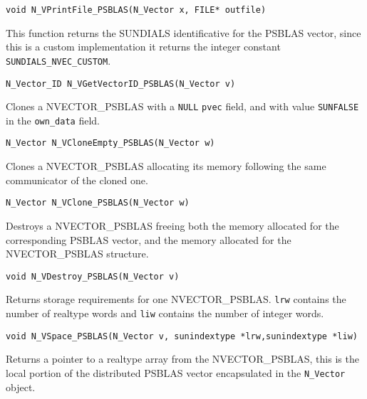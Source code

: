 \documentclass[twoside,a4paper]{refart}
\begin{document}
\begin{description}
	 \lstinline[style=CStyle]|void N_VPrintFile_PSBLAS(N_Vector x, FILE* outfile)|
	
	\item[\fbox{\texttt{N\_VGetVectorID\_PSBLAS}}] This function returns the SUNDIALS identificative for the PSBLAS vector, since this is a custom implementation it returns the integer constant \lstinline[style=CStyle]|SUNDIALS_NVEC_CUSTOM|.
	
	 \lstinline[style=CStyle]|N_Vector_ID N_VGetVectorID_PSBLAS(N_Vector v)|
 	
 	\item[\fbox{\texttt{N\_VCloneEmpty\_PSBLAS}}] Clones a NVECTOR\_PSBLAS with a \lstinline[style=CStyle]|NULL| \lstinline[style=CStyle]|pvec| field, and with value \lstinline[style=CStyle]|SUNFALSE| in the \lstinline[style=CStyle]|own_data| field.
 	
 	 \lstinline[style=CStyle]|N_Vector N_VCloneEmpty_PSBLAS(N_Vector w)|
 	
 	\item[\fbox{\texttt{N\_VClone\_PSBLAS}}] Clones a NVECTOR\_PSBLAS allocating its memory following the same communicator of the cloned one.
 	
 	 \lstinline[style=CStyle]|N_Vector N_VClone_PSBLAS(N_Vector w)|
 	
 	\item[\fbox{\texttt{N\_VDestroy\_PSBLAS}}] Destroys a NVECTOR\_PSBLAS freeing both the memory allocated for the corresponding PSBLAS vector, and the memory allocated for the NVECTOR\_PSBLAS structure.
 	
 	 \lstinline[style=CStyle]|void N_VDestroy_PSBLAS(N_Vector v)|
 	
 	\item[\fbox{\texttt{N\_VSpace\_PSBLAS}}] Returns storage requirements for one NVECTOR\_PSBLAS. \lstinline[style=CStyle]|lrw| contains the number of realtype words and \lstinline[style=CStyle]|liw| contains the number of integer words.
 	
 	 \lstinline[style=CStyle]|void N_VSpace_PSBLAS(N_Vector v, sunindextype *lrw,sunindextype *liw)|
 	
 	\item[\fbox{\texttt{N\_VGetArrayPointer\_PSBLAS}}] Returns a pointer to a realtype array from the NVECTOR\_PSBLAS, this is the local portion of the distributed PSBLAS vector encapsulated in the \texttt{N\_Vector} object.
 	

\end{description}
\end{document}
